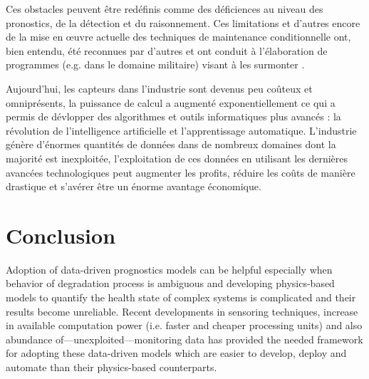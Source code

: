 Ces obstacles peuvent être redéfinis comme des déficiences au niveau des pronostics, de la détection et du raisonnement. Ces limitations et d'autres encore de la mise en œuvre actuelle des techniques de maintenance conditionnelle ont, bien entendu, été reconnues par d'autres et ont conduit à l'élaboration de programmes (e.g. dans le domaine militaire) visant à les surmonter \cite{Hess2008}.

Aujourd'hui, les capteurs dans l'industrie sont devenus peu coûteux et omniprésents, la puissance de calcul a augmenté exponentiellement ce qui a permis de dévlopper des algorithmes et outils informatiques plus avancés : la révolution de l'intelligence artificielle et l'apprentissage automatique. L’industrie génère d’énormes quantités de données dans de nombreux domaines dont la majorité est inexploitée, l’exploitation de ces données en utilisant les dernières avancées technologiques peut augmenter les profits, réduire les coûts de manière drastique et s’avérer être un énorme avantage économique.

\section{Conclusion}
Adoption of data-driven prognostics models can be helpful especially when behavior of degradation process is ambiguous and developing physics-based models to quantify the health state of complex systems is complicated and their results become unreliable. Recent developments in sensoring techniques, increase in available computation power (i.e. faster and cheaper processing units) and also abundance of—unexploited—monitoring data has provided the needed framework for adopting these data-driven models which are easier to develop, deploy and automate than their physics-based counterparts.